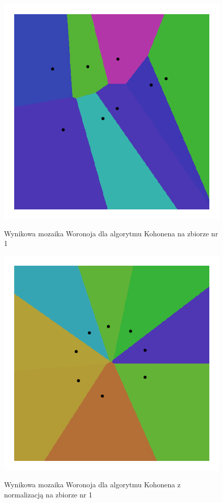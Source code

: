 \documentclass{classrep}
\begin{document}
\begin{figure}[h]
	\centering
		\includegraphics[scale=0.55]{pictures/kohonen_8_neuronow_zbior_0.png}
	\label{fig:kohonen_8_neuronow_zbior_0}
	\caption{Wynikowa mozaika Woronoja dla algorytmu Kohonena na zbiorze nr 1}
\end{figure}

\begin{figure}[h]
	\centering
		\includegraphics[scale=0.55]{pictures/kohonen_8_neuronow_zbior_0_normalized.png}
	\label{fig:kohonen_8_neuronow_zbior_0_normalized}
	\caption{Wynikowa mozaika Woronoja dla algorytmu Kohonena z normalizacją na zbiorze nr 1}
\end{figure}
\end{document}
